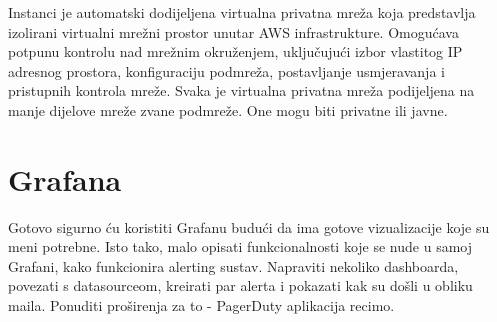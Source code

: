 Instanci je automatski dodijeljena virtualna privatna mreža  koja predstavlja izolirani virtualni mrežni prostor unutar AWS infrastrukture. Omogućava potpunu kontrolu nad mrežnim okruženjem, uključujući izbor vlastitog IP adresnog prostora, konfiguraciju podmreža, postavljanje usmjeravanja i pristupnih kontrola mreže. Svaka je virtualna privatna mreža podijeljena na manje dijelove mreže zvane podmreže. One mogu biti privatne ili javne. 




\section{Grafana}

Gotovo sigurno ću koristiti Grafanu budući da ima gotove vizualizacije koje su meni potrebne. Isto tako, malo opisati funkcionalnosti koje se nude u samoj Grafani, kako funkcionira alerting sustav. Napraviti nekoliko dashboarda, povezati s datasourceom, kreirati par alerta i pokazati kak su došli u obliku maila. Ponuditi proširenja za to - PagerDuty aplikacija recimo.